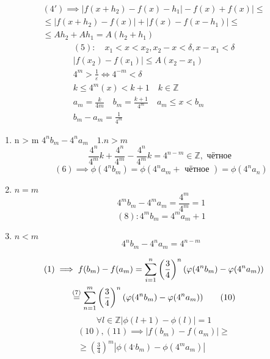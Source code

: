 \documentclass[main]{subfiles}
\begin{document}
\begin{example}
          \begin{multline*}
          (4\prime) \implies |f(x+h_2) - f(x)-h_1|  -f(x) + f(x)| \leq \\ 
          \leq  |f(x+h_2)-f(x)| + |f(x) - f(x-h_1)| \leq \\
          \leq Ah_2 + Ah_1 = A(h_2 + h_1) \tag{5} \end{multline*}
          \begin{gather*}
          (5): \quad x_1 < x < x_2, x_2 - x  < \delta, x - x_1 < \delta \\
          |f(x_2) - f(x_1)| \leq A(x_2-x_1) \tag{5\prime} \\
          4^m > \frac{1}{\varepsilon} \Leftrightarrow 4^{-m} < \delta \\
          k \leq 4^m(x) < k+1 \quad k \in \mathbb{Z} \\     
          a_m = \frac{k}{4m} \quad b_m = \frac{k+1}{4^m} \quad a_m \leq x < b_m \\
          b_m - a_m = \frac{1}{4^m} 
     \end{gather*}
          \begin{enumerate}
          \item n > m          
          $4^nb_m-4^na_m \quad 1. n > m$ \\
          \[\frac{4^n}{4^m}k + \frac{4^n}{4^m} - \frac{4^n}{4^m}k = 4^{n-m} \in \mathbb{Z}, \text{ чётное } \tag{6} \]
          \[(6) \implies \phi(4^nb_m) = \phi(4^na_m + \text { чётное }) =  \phi(4^na_n) \tag{7} \]
          \item $n = m$ \\
           \[4^mb_m - 4^ma_m = \frac{4^m}{4^m} = 1 \tag{8} \]
          \[(8): 4^mb_m = 4^m a_m + 1 \] 
          \item $ n < m $
          \[ 4^nb_m - 4^na_m = 4^{n-m} \tag{9} \]
          \end{enumerate}
          \begin{multline*}
          (1) \implies f(b_m) - f(a_m) = \sum^n_{i=1} \left( \frac{3}{4} \right) ^n (\varphi(4^nb_m) - \varphi(4^na_m)) \\
          \stackrel{(7)}{=} \sum^m_{n=1} \left( \frac{3}{4} \right)^n(\varphi(4^nb_m) - \varphi(4^na_m)) \tag{10} \end{multline*}
          \[\forall l \in \mathbb{Z} |\phi(l+1) - \phi(l)| = 1 \tag{11} \]
          \begin{multline*}
          (10), (11) \implies |f(b_m) - f(a_m)|  \geq \\ \geq \left( \frac{3}{4} \right)^m |\phi(4^,b_m) - \phi(4^ma_m)|

\end{multline*}
\end{example}
\end{document}
